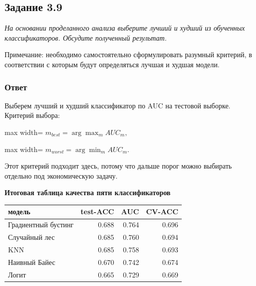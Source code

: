 \documentclass[11pt]{article}
\newcounter{none}
\newenvironment{tasktext}
      {\begin{tcolorbox}[breakable, colback=black!3, colframe=black!28,
        boxrule=0.4pt, arc=1.5mm, left=7pt, right=7pt, top=5pt, bottom=5pt,
        before skip=0.35em, after skip=0.75em]\itshape}
      {\end{tcolorbox}}
\begin{document}
    \subsection{Задание 3.9}\label{ux437ux430ux434ux430ux43dux438ux435-3.9}

\begin{tasktext}
На основании проделанного анализа выберите лучший и худший из обученных
классификаторов. Обсудите полученный результат.

Примечание: необходимо самостоятельно сформулировать разумный критерий,
в соответствии с которым будут определяться лучшая и худшая модели.
\end{tasktext}

\subsubsection{Ответ}

Выберем лучший и худший классификатор по AUC на тестовой выборке.
Критерий выбора:

\begin{center}
\begin{adjustbox}{max width=\linewidth}
\(\displaystyle m_{best} = \arg\max_m AUC_m,\)
\end{adjustbox}
\end{center}

\begin{center}
\begin{adjustbox}{max width=\linewidth}
\(\displaystyle m_{worst} = \arg\min_m AUC_m.\)
\end{adjustbox}
\end{center}

Этот критерий подходит здесь, потому что дальше порог можно выбирать
отдельно под экономическую задачу.

    \textbf{Итоговая таблица качества пяти классификаторов}

{\def\LTcaptype{none} %
\begin{longtable}[]{@{}lrrr@{}}
\toprule\noalign{}
модель & test-ACC & AUC & CV-ACC \\
\midrule\noalign{}
\endhead
\bottomrule\noalign{}
\endlastfoot
Градиентный бустинг & 0.688 & 0.764 & 0.696 \\
Случайный лес & 0.685 & 0.760 & 0.694 \\
KNN & 0.685 & 0.758 & 0.693 \\
Наивный Байес & 0.670 & 0.742 & 0.674 \\
Логит & 0.665 & 0.729 & 0.669 \\
\end{longtable}
}
\end{document}
